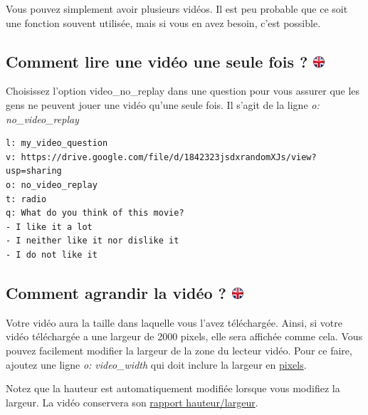 \documentclass[
]{book}
\begin{document}
Vous pouvez simplement avoir plusieurs vidéos. Il est peu probable que
ce soit une fonction souvent utilisée, mais si vous en avez besoin,
c'est possible.

\hypertarget{comment-lire-une-viduxe9o-une-seule-fois}{%
\subsection[Comment lire une vidéo une seule fois ?
]{\texorpdfstring{Comment lire une vidéo une seule fois ?
\href{https://www.psytoolkit.org/lessons/surveyaudiovideo.html\#_how_to_play_a_video_only_one_time}{\protect\includegraphics{img/ukflag.png}}}{Comment lire une vidéo une seule fois ? }}\label{comment-lire-une-viduxe9o-une-seule-fois}}

Choisissez l'option video\_no\_replay dans une question pour vous
assurer que les gens ne peuvent jouer une vidéo qu'une seule fois. Il
s'agit de la ligne \emph{o: no\_video\_replay}

\begin{verbatim}
l: my_video_question
v: https://drive.google.com/file/d/1842323jsdxrandomXJs/view?usp=sharing
o: no_video_replay
t: radio
q: What do you think of this movie?
- I like it a lot
- I neither like it nor dislike it
- I do not like it
\end{verbatim}

\hypertarget{comment-agrandir-la-viduxe9o}{%
\subsection[Comment agrandir la vidéo ? ]{\texorpdfstring{Comment
agrandir la vidéo ?
\href{https://www.psytoolkit.org/lessons/surveyaudiovideo.html\#_how_to_make_the_video_larger}{\protect\includegraphics{img/ukflag.png}}}{Comment agrandir la vidéo ? }}\label{comment-agrandir-la-viduxe9o}}

Votre vidéo aura la taille dans laquelle vous l'avez téléchargée. Ainsi,
si votre vidéo téléchargée a une largeur de 2000 pixels, elle sera
affichée comme cela. Vous pouvez facilement modifier la largeur de la
zone du lecteur vidéo. Pour ce faire, ajoutez une ligne \emph{o:
video\_width} qui doit inclure la largeur en
\href{https://fr.wikipedia.org/wiki/Pixel}{pixels}.

Notez que la hauteur est automatiquement modifiée lorsque vous modifiez
la largeur. La vidéo conservera son
\href{https://fr.wikipedia.org/wiki/Aspect_ratio}{rapport
hauteur/largeur}.
\end{document}
